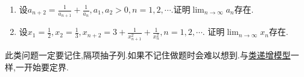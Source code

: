 \documentclass[lang=cn,newtx,10pt,scheme=chinese]{elegantbook}
\begin{document}
   \begin{example}[类递减模型]\label{example:类递减模型}
   \begin{enumerate}
      \item 设\(a_{n + 2} = \frac{1}{a_{n + 1}} + \frac{1}{a_{n}}, a_{1}, a_{2} > 0, n = 1,2,\cdots\).证明\(\lim_{n \to \infty} a_{n}\)存在.
   
      \item 设\(x_{1} = \frac{1}{2}, x_{2} = \frac{1}{3}, x_{n + 2} = 3 + \frac{1}{x_{n + 1}^{2}} + \frac{1}{x_{n}^{2}}, n = 1,2,\cdots\).
      证明\(\lim_{n \to \infty} x_{n}\)存在.
   \end{enumerate}   
   \end{example}
   \begin{note}
      此类问题一定要记住,隔项抽子列.如果不记住做题时会难以想到.与\hyperref[example:类递增模型]{类递增模型}一样,一开始要定界.
   \end{note}
\end{document}
